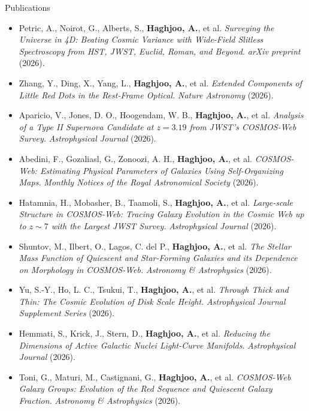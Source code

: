 \documentclass[]{kyvernitis-resume}
\begin{document}
\begin{section}{Publications}
\begin{itemize}
\item Petric, A., Noirot, G., Alberts, S., \textbf{Haghjoo, A.}, et al.
\textit{Surveying the Universe in 4D: Beating Cosmic Variance with Wide-Field Slitless Spectroscopy from HST, JWST, Euclid, Roman, and Beyond.}
\textit{arXiv preprint} (2026).

\item Zhang, Y., Ding, X., Yang, L., \textbf{Haghjoo, A.}, et al.
\textit{Extended Components of Little Red Dots in the Rest-Frame Optical.}
\textit{Nature Astronomy} (2026).

\item Aparicio, V., Jones, D. O., Hoogendam, W. B., \textbf{Haghjoo, A.}, et al.
\textit{Analysis of a Type II Supernova Candidate at $z=3.19$ from JWST's COSMOS-Web Survey.}
\textit{Astrophysical Journal} (2026).

\item Abedini, F., Gozaliasl, G., Zonoozi, A. H., \textbf{Haghjoo, A.}, et al.
\textit{COSMOS-Web: Estimating Physical Parameters of Galaxies Using Self-Organizing Maps.}
\textit{Monthly Notices of the Royal Astronomical Society} (2026).

\item Hatamnia, H., Mobasher, B., Taamoli, S., \textbf{Haghjoo, A.}, et al.
\textit{Large-scale Structure in COSMOS-Web: Tracing Galaxy Evolution in the Cosmic Web up to $z\sim7$ with the Largest JWST Survey.}
\textit{Astrophysical Journal} (2026).

\item Shuntov, M., Ilbert, O., Lagos, C. del P., \textbf{Haghjoo, A.}, et al.
\textit{The Stellar Mass Function of Quiescent and Star-Forming Galaxies and its Dependence on Morphology in COSMOS-Web.}
\textit{Astronomy \& Astrophysics} (2026).

\item Yu, S.-Y., Ho, L. C., Tsukui, T., \textbf{Haghjoo, A.}, et al.
\textit{Through Thick and Thin: The Cosmic Evolution of Disk Scale Height.}
\textit{Astrophysical Journal Supplement Series} (2026).

\item Hemmati, S., Krick, J., Stern, D., \textbf{Haghjoo, A.}, et al.
\textit{Reducing the Dimensions of Active Galactic Nuclei Light-Curve Manifolds.}
\textit{Astrophysical Journal} (2026).

\item Toni, G., Maturi, M., Castignani, G., \textbf{Haghjoo, A.}, et al.
\textit{COSMOS-Web Galaxy Groups: Evolution of the Red Sequence and Quiescent Galaxy Fraction.}
\textit{Astronomy \& Astrophysics} (2026).


\end{itemize}
\end{section}
\end{document}
